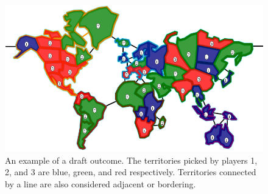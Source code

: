 \documentclass[letterpaper]{article}
\numberwithin{equation}{section}
\numberwithin{theorem}{section}
\numberwithin{lemma}{section}
\numberwithin{df}{section}
\begin{document}
\begin{figure}[t]
	\centering
	\includegraphics[scale=0.3]{figs/DraftExample.png}
	\caption{An example of a draft outcome.  The territories picked by players 1, 2, and 3 are blue, green, and red respectively.  Territories connected by a line are also considered adjacent or bordering.}
	\label{fig:DraftExample}
\end{figure}
\end{document}
